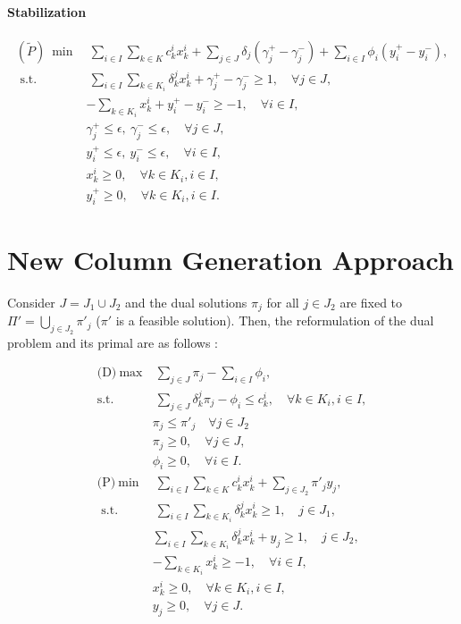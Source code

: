 \documentclass[12pt]{article}
\begin{document}
	\paragraph{Stabilization}
	\begin{align*}
	(\tilde{P})~ \min& ~ \sum _ { i \in I } \sum _ { k \in K } c _ { k } ^ { i } x _ { k } ^ { i } + \sum_{ j \in J }\delta_j (\gamma_j^+ - \gamma_j^-) + \sum_{i \in I}\phi_i(y_i^+ - y_i^-),\\
	\text { s.t. }&  ~ \sum _ { i \in I } \sum _ { k \in K _ { i } } \delta _ { k } ^ { j } x _ { k } ^ { i } + \gamma_j^+ - \gamma_j^- \geq 1 , \quad \forall j \in J, \\
	&- \sum _ { k \in K _ { i } } x _ { k } ^ { i } +y_i^+ - y_i^-\geq - 1 , \quad \forall i \in I ,\\
	& \gamma_j^+ \leq \epsilon , ~ \gamma_j^- \leq \epsilon,\quad \forall j \in J,  \\
	& y_i^+ \leq \epsilon, ~ y_i^-  \leq \epsilon, \quad \forall i \in I, \\
	&x _ { k } ^ { i } \geq 0 , \quad \forall k \in K _ { i } , i \in I,\\
	&y_i^+\geq 0 , \quad \forall k \in K _ { i } , i \in I.
	\end{align*}
	
	\section{New Column Generation Approach}
	Consider $J = J_1 \cup J_2$ and the dual solutions $\pi_j$ for all $j \in J_2$ are fixed to $\Pi' = \bigcup_{j \in J_2} \pi'_j$ ($\pi'$ is a feasible solution). Then, the reformulation of the dual problem and its primal are as follows : 
	
	\begin{align*}
		\text{(D)}~   \max& ~ \sum _ { j \in J } \pi _ { j } - \sum _ { i \in I } \phi _ { i }, \\
	\text{s.t. } & ~ \sum _ { j \in J } \delta _ { k } ^ { j } \pi _ { j } - \phi _ { i } \leq c _ { k } ^ { i } , \quad \forall k \in K _ { i } , i \in I, \\
	& \pi_j \leq \pi'_j \quad \forall j \in J_2 \\
	&\pi _ { j } \geq 0 , \quad \forall j \in J ,\\
	&\phi _ { i } \geq 0 , \quad \forall i \in I. \\[5mm]
	\text{(P)}~ \min& ~ \sum _ { i \in I } \sum _ { k \in K } c _ { k } ^ { i } x _ { k } ^ { i } + \sum_{ j \in J_2 } \pi'_j y_j,\\
	\text { s.t. }&  ~ \sum _ { i \in I } \sum _ { k \in K _ { i } } \delta _ { k } ^ { j } x _ { k } ^ { i } \geq 1 , \quad j \in J_1, \\
	& \sum _ { i \in I } \sum _ { k \in K _ { i } } \delta _ { k } ^ { j } x _ { k } ^ { i } + y_j \geq 1 , \quad j \in J_2, \\
	&- \sum _ { k \in K _ { i } } x _ { k } ^ { i } \geq - 1 , \quad \forall i \in I ,\\
	&x _ { k } ^ { i } \geq 0 , \quad \forall k \in K _ { i } , i \in I, \\
	&y_j \geq 0, \quad \forall j \in J.
	\end{align*}
	
\end{document}

